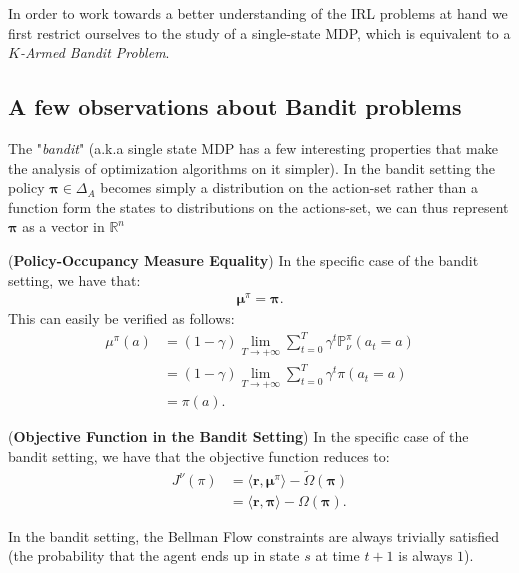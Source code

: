 In order to work towards a better understanding of the IRL problems at hand we first restrict ourselves to the study of a single-state MDP, which is equivalent to a \textit{$K$-Armed Bandit Problem}.

\subsection{A few observations about Bandit problems}

The "\textit{bandit}" (a.k.a single state MDP has a few interesting properties that make the analysis of optimization algorithms on it simpler). In the bandit setting the policy $\bm{\pi} \in \Delta_A$ becomes simply a distribution on the action-set rather than a function form the states to distributions on the actions-set, we can thus represent $\bm{\pi}$ as a vector in $\mathbb{R}^n$

\begin{observation}
    (\textbf{Policy-Occupancy Measure Equality}) In the specific case of the bandit setting, we have that:
    \begin{align*}
        \bm{\mu}^\pi = \bm{\pi}.
    \end{align*}
    This can easily be verified as follows:
    \begin{align*}
        \mu^\pi(a) &= (1-\gamma) \lim_{T \rightarrow + \infty} \sum_{t=0}^T \gamma^t \mathbb{P}_\nu^\pi(a_t=a) 
        \\
        &= (1-\gamma) \lim_{T \rightarrow + \infty} \sum_{t=0}^T \gamma^t \pi(a_t=a) \\
        &= \pi(a).
    \end{align*}
\end{observation}

\begin{observation}
    (\textbf{Objective Function in the Bandit Setting}) In the specific case of the bandit setting, we have that the objective function reduces to:
    \begin{align*}
        J^\nu(\pi) &= \langle \bm{r},\bm{\mu}^\pi \rangle -\tilde{\Omega}(\bm{\pi})\\
        &= \langle \bm{r}, \bm{\pi} \rangle - \Omega(\bm{\pi}).
    \end{align*}
\end{observation}

\begin{observation}
    In the bandit setting, the Bellman Flow constraints are always trivially satisfied (the probability that the agent ends up in state $s$ at time $t+1$ is always $1$). 
\end{observation}

